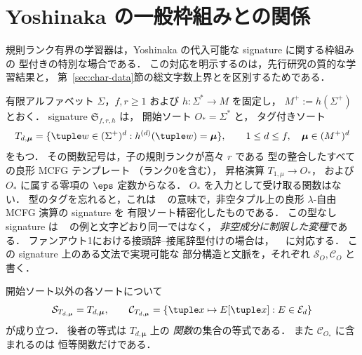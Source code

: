 
\section{Yoshinaka の一般枠組みとの関係}
\label{sec:general-framework}

規則ランク有界の学習器は，Yoshinaka の代入可能な
signature に関する枠組み~\cite{Yoshinaka2015General} の
型付きの特別な場合である．
この対応を明示するのは，先行研究の質的な学習結果と，
第~\ref{sec:char-data}節の総文字数上界とを区別するためである．

有限アルファベット $\Sigma$，$f,r\ge1$ および
$h:\Sigma^*\to M$ を固定し，
$M^+:=h(\Sigma^+)$ とおく．
signature $\mathfrak S_{f,r,h}$ は，
開始ソート $O_*=\Sigma^*$ と，
タグ付きソート
\[
 T_{d,\boldsymbol\mu}
 =\{\tuple w\in(\Sigma^+)^d:
 h^{(d)}(\tuple w)=\boldsymbol\mu\},
 \qquad
 1\le d\le f,\quad\boldsymbol\mu\in(M^+)^d
\]
をもつ．
その関数記号は，子の規則ランクが高々 $r$ である
型の整合したすべての良形 MCFG テンプレート
（ランク0を含む），
昇格演算 $T_{1,\mu}\to O_*$，
および $O_*$ に属する零項の $\eps$ 定数からなる．
$O_*$ を入力として受け取る関数はない．
型のタグを忘れると，これは
~\cite[Section~8]{Yoshinaka2015General}
の意味で，非空タプル上の良形
$\lambda$-自由 MCFG 演算の signature を
有限ソート精密化したものである．
この型なし signature は
~\cite[Example~3]{Yoshinaka2015General}
の例と文字どおり同一ではなく，
\emph{非空成分に制限した変種}である．
ファンアウト1における接頭辞--接尾辞型付けの場合は，
~\cite[Example~4]{Yoshinaka2015General}
に対応する．
この signature 上のある文法で実現可能な
部分構造と文脈を，それぞれ
$\mathcal S_O,\mathcal C_O$ と書く．

\begin{lemma}
\label{lem:signature-contexts}
開始ソート以外の各ソートについて
\[
 \mathcal S_{T_{d,\boldsymbol\mu}}
 =T_{d,\boldsymbol\mu},
 \qquad
 \mathcal C_{T_{d,\boldsymbol\mu}}
 =\{\tuple x\mapsto E[\tuple x]:E\in\mathcal E_d\}
\]
が成り立つ．
後者の等式は $T_{d,\boldsymbol\mu}$ 上の
\emph{関数}の集合の等式である．
また $\mathcal C_{O_*}$ に含まれるのは
恒等関数だけである．
\end{lemma}

